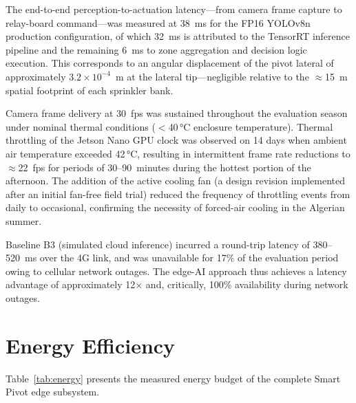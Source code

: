 \documentclass[12pt,a4paper]{report}
\begin{document}
The end-to-end perception-to-actuation latency---from camera frame capture to relay-board command---was measured at 38~ms for the FP16 YOLOv8n production configuration, of which 32~ms is attributed to the TensorRT inference pipeline and the remaining 6~ms to zone aggregation and decision logic execution. This corresponds to an angular displacement of the pivot lateral of approximately $3.2 \times 10^{-4}$~m at the lateral tip---negligible relative to the $\approx$15~m spatial footprint of each sprinkler bank.

Camera frame delivery at 30~fps was sustained throughout the evaluation season under nominal thermal conditions ($<$40\,°C enclosure temperature). Thermal throttling of the Jetson Nano GPU clock was observed on 14 days when ambient air temperature exceeded 42\,°C, resulting in intermittent frame rate reductions to $\approx$22~fps for periods of 30--90~minutes during the hottest portion of the afternoon. The addition of the active cooling fan (a design revision implemented after an initial fan-free field trial) reduced the frequency of throttling events from daily to occasional, confirming the necessity of forced-air cooling in the Algerian summer.

Baseline B3 (simulated cloud inference) incurred a round-trip latency of 380--520~ms over the 4G link, and was unavailable for 17\% of the evaluation period owing to cellular network outages. The edge-AI approach thus achieves a latency advantage of approximately 12$\times$ and, critically, 100\% availability during network outages.

\section{Energy Efficiency}

Table~\ref{tab:energy} presents the measured energy budget of the complete Smart Pivot edge subsystem.
\end{document}
